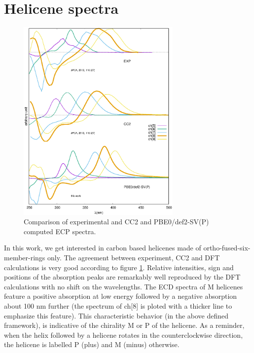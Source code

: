 \documentclass[aip]{revtex4-1}
\begin{document}
\section*{Helicene spectra}
\begin{figure}
\begin{center}
\includegraphics[width=8cm]{comparison_EXP_CC2_DFT.eps}
\end{center}
\caption{\label{fig:comparison_EXP_CC2_DFT} 
Comparison of experimental and CC2 and PBE0/def2-SV(P) computed ECP spectra.
}
\end{figure}
In this work, we get interested in carbon based helicenes made of
ortho-fused-six-member-rings only.
The agreement between experiment, CC2 and DFT calculations is very good according to
figure \ref{fig:comparison_EXP_CC2_DFT}.
Relative intensities, sign and positions of the absorption peaks are remarkably
well reproduced by the DFT calculations with no shift on the wavelengths.
The ECD spectra of M helicenes feature a positive absorption at low energy 
followed by a negative absorption about 100 nm further (the spectrum of ch[8]
is ploted with a thicker line to emphasize this feature).
This characteristic behavior (in the above defined framework), is indicative
of the chirality M or P of the helicene.
As a reminder, when the helix followed by a helicene rotates in the counterclockwise
direction, the helicene is labelled P (plus) and M (minus) otherwise.
\end{document}
